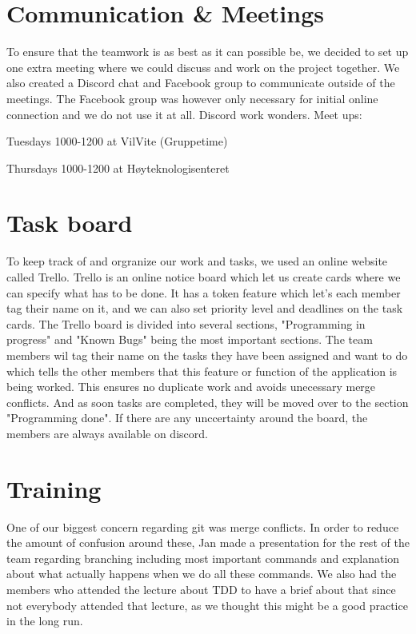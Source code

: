 \documentclass{article}
\begin{document}
\section*{Communication \& Meetings}
To ensure that the teamwork is as best as it can possible be, we decided to set up one extra meeting where we could discuss and work on the project together. We also created a Discord chat and Facebook group to communicate outside of the meetings. The Facebook group was however only necessary for initial online connection and we do not use it at all. Discord work wonders.
Meet ups:
			\begin{list}{-}{}
				\item Tuesdays 1000-1200 at VilVite (Gruppetime) 
				\item Thursdays 1000-1200 at Høyteknologisenteret
			\end{list}

\section*{Task board}
To keep track of and orgranize our work and tasks, we used an online website called Trello. Trello is an online notice board which let us create cards where we can specify what has to be done. It has a token feature which let's each member tag their name on it, and we can also set priority level and deadlines on the task cards. The Trello board is divided into several sections, "Programming in progress" and "Known Bugs" being the most important sections. The team members wil tag their name on the tasks they have been assigned and want to do which tells the other members that this feature or function of the application is being worked. This ensures no duplicate work and avoids unecessary merge conflicts. And as soon tasks are completed, they will be moved over to the section "Programming done". If there are any unccertainty around the board, the members are always available on discord.

\section*{Training}
One of our biggest concern regarding git was merge conflicts. In order to reduce the amount of confusion around these, Jan made a presentation for the rest of the team regarding branching including most important commands and explanation about what actually happens when we do all these commands.
We also had the members who attended the lecture about TDD to have a brief about that since not everybody attended that lecture, as we thought this might be a good practice in the long run.
\end{document}
